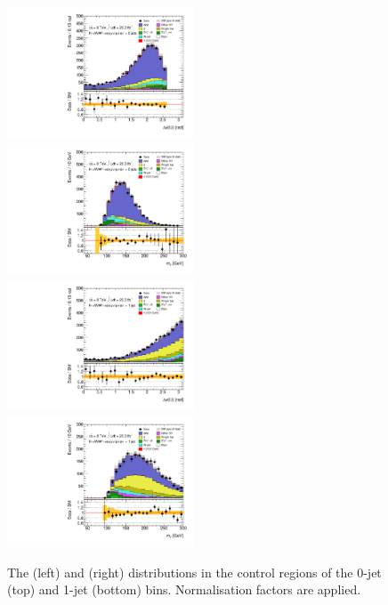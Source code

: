\begin{figure}[t]
	\includegraphics[width=0.495\textwidth]{tex/ww/emme_CutWWControl_0jet_DPhill_mh125_lin}
	\hfill
	\includegraphics[width=0.495\textwidth]{tex/ww/emme_CutWWControl_0jet_MT_TrackHWW_Clj_mh125_lin}
	\\
	\includegraphics[width=0.495\textwidth]{tex/ww/emme_CutWWControl_1jet_DPhill_mh125_lin}
	\hfill
	\includegraphics[width=0.495\textwidth]{tex/ww/emme_CutWWControl_1jet_MT_TrackHWW_Clj_mh125_lin}
	\caption{The \dphill (left) and \mt (right) distributions in the \WW control regions 
	of the 0-jet (top) and 1-jet (bottom) bins. Normalisation factors are applied.}
	\label{fig:ww_bkg:cr_plots}
\end{figure}


